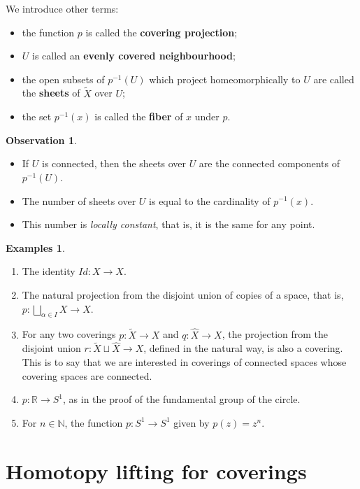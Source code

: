 \documentclass{book}
\theoremstyle{definition}
\newtheorem*{obs}{Observation}
\newtheorem*{ejems}{Examples}
\newcommand{\R}{\mathbb{R}}
\newcommand{\N}{\mathbb{N}}
\begin{document}

We introduce other terms:
\begin{itemize}
\item the function $p$ is called the \textbf{covering
projection};
\item $U$ is called an \textbf{evenly covered neighbourhood};
\item the open subsets of $p^{-1}(U)$ which project
homeomorphically to $U$ are called the \textbf{sheets} of
$\tilde X$ over $U$;
\item the set $p^{-1}(x)$ is called the \textbf{fiber} of
$x$ under $p$.
\end{itemize}

\begin{obs}\leavevmode
\begin{itemize}
\item If $U$ is connected, then the sheets over $U$ are the
connected components of $p^{-1}(U)$.
\item The number of sheets over $U$ is equal to the
cardinality of $p^{-1}(x)$.
\item This number is \textit{locally constant}, that is, it
is the same for any point.
\end{itemize}
\end{obs}

\begin{ejems}\leavevmode
\begin{enumerate}
\item The identity $Id:X\to X$.
\item The natural projection from the disjoint union of
copies of a space, that is,
$p:\bigsqcup_{\alpha\in I}X\to X$.
\item For any two coverings $p:\tilde X\to X$ and
$q:\hat X\to X$, the projection from the disjoint union
$r:\tilde X\sqcup\hat X\to X$, defined in the natural way,
is also a covering. This is to say that we are interested in
coverings of connected spaces whose covering spaces are
connected.
\item $p:\R\to S^1$, as in the proof of the fundamental
group of the circle.
\item For $n\in\N$, the function $p:S^1\to S^1$ given by
$p(z)=z^n$.
\end{enumerate}
\end{ejems}

\section{Homotopy lifting for coverings}
\end{document}
